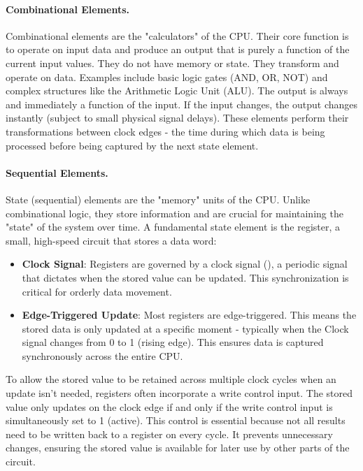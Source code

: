 \paragraph{Combinational Elements.} Combinational elements are the "calculators" of the CPU. Their core function is
to operate on input data and produce an output that is purely a function of the
current input values. They do not have memory or state. They transform and
operate on data. Examples include basic logic gates (AND, OR, NOT) and complex
structures like the Arithmetic Logic Unit (ALU). The output is always and
immediately a function of the input. If the input changes, the output changes
instantly (subject to small physical signal delays). These elements perform
their transformations between clock edges - the time during which data is being
processed before being captured by the next state element.

\paragraph{Sequential Elements.} State (sequential) elements are the "memory" units of the CPU. Unlike
combinational logic, they store information and are crucial for maintaining the
"state" of the system over time. A fundamental state element is the register, a
small, high-speed circuit that stores a data word:

\begin{itemize}
    \item \textbf{Clock Signal}: Registers are governed by a clock signal (), a periodic signal that dictates when the stored value can be updated. This synchronization is critical for orderly data movement.
    \item \textbf{Edge-Triggered Update}: Most registers are edge-triggered. This means the stored data is only updated at a specific moment - typically when the Clock signal changes from 0 to 1 (rising edge). This ensures data is captured synchronously across the entire CPU.
\end{itemize}

To allow the stored value to be retained across multiple clock cycles when an
update isn't needed, registers often incorporate a write control input. The
stored value only updates on the clock edge if and only if the write control
input is simultaneously set to 1 (active). This control is essential because
not all results need to be written back to a register on every cycle. It
prevents unnecessary changes, ensuring the stored value is available for later
use by other parts of the circuit.

